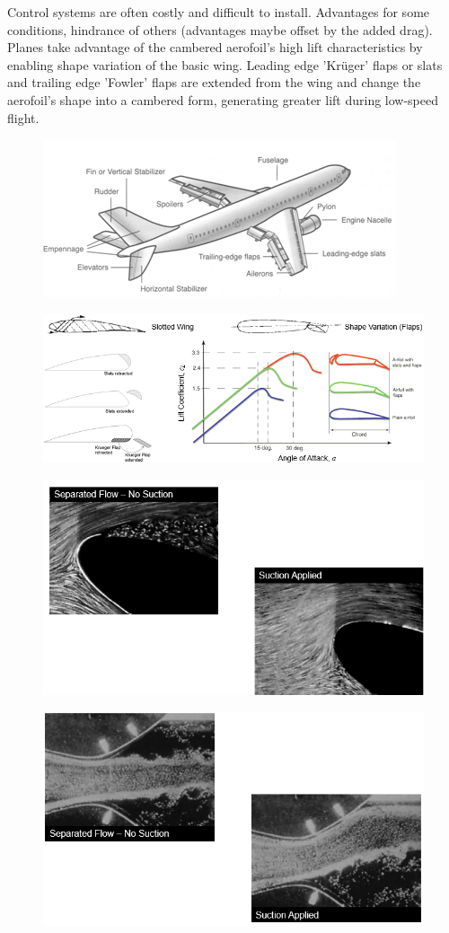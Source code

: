 \documentclass[class=report, crop=false, 12pt,a4paper]{standalone}
\begin{document}
Control systems are often costly and difficult to install. Advantages for some conditions, hindrance of others (advantages maybe offset by the added drag). Planes take advantage of the cambered aerofoil's high lift characteristics by enabling shape variation of the basic wing. Leading edge 'Krüger' flaps or slats and trailing edge 'Fowler' flaps are extended from the wing and change the aerofoil's shape into a cambered form, generating greater lift during low-speed flight.
\begin{figure}[H]
  \centering
  \includegraphics[width =0.5 \textwidth]{../img/diagram63.png}
\end{figure}
\begin{figure}[H]
  \centering
  \includegraphics[width =0.8 \textwidth]{../img/diagram62.png}
\end{figure}
\begin{figure}[H]
  \centering
  \includegraphics[width =0.7 \textwidth]{../img/diagram64.png}
\end{figure}
\begin{figure}[H]
  \centering
  \includegraphics[width =0.7 \textwidth]{../img/diagram65.png}
\end{figure}
\end{document}
